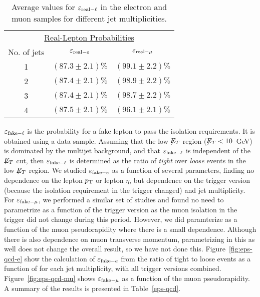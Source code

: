 \vspace{-0.2in}
\begin{table}[!h!tbp]
\begin{center}
\begin{minipage}{2.5 in}
\begin{ruledtabular}
\begin{tabular}{c||cc}
\multicolumn{3}{c}{\underline{Real-Lepton Probabilities}}
\vspace{0.1in}\\
No. of jets & $\varepsilon_{{\rm real-}e}$
            & $\varepsilon_{{\rm real-}\mu}$ \\
\hline
  1  &  $(87.3 \pm 2.1)\%$  &  $(99.1 \pm 2.2)\%$  \\
  2  &  $(87.4 \pm 2.1)\%$  &  $(98.9 \pm 2.2)\%$  \\
  3  &  $(87.4 \pm 2.1)\%$  &  $(98.7 \pm 2.2)\%$  \\
  4  &  $(87.5 \pm 2.1)\%$  &  $(96.1 \pm 2.1)\%$
\end{tabular}
\end{ruledtabular}
\vspace{-0.1in}
\caption[epssignal]{Average values for $\varepsilon_{{\rm real-}\ell}$
in the electron and muon samples for different jet multiplicities.}
\label{eps-signal}
\end{minipage}
\end{center}
\end{table}

\vspace{-0.2in}
$\varepsilon_{{\rm fake-}\ell}$ is the probability for a fake lepton
to pass the isolation requirements. It is obtained using a data
sample. Assuming that the low $\mbox{$\not\!\!E_T$}$ region ($\mbox{$\not\!\!E_T$} < 10$~GeV) is
dominated by the multijet background, and that $\varepsilon_{{\rm
fake-}\ell}$ is independent of the $\mbox{$\not\!\!E_T$}$ cut, then $\varepsilon_{{\rm
fake-}\ell}$ is determined as the ratio of \emph{tight} over
\emph{loose} events in the low $\mbox{$\not\!\!E_T$}$ region.
We studied $\varepsilon_{{\rm fake-}e}$ as a function of several
parameters, finding no dependence on the lepton $\mbox{$p_{\rm T}$}$ or lepton
$\eta$, but dependence on the trigger version (because the isolation
requirement in the trigger changed) and jet multiplicity. For
$\varepsilon_{{\rm fake-}\mu}$, we performed a similar set of studies
and found no need to parametrize as a function of the trigger version
as the muon isolation in the trigger did not change during this
period. However, we did paramterize as a function of the muon
pseudorapidity where there is a small dependence. Although there is
also dependence on muon transverse momentum, parametrizing in this as
well does not change the overall result, so we have not done this.
Figure~\ref{fig:eps-qcd-e} show the calculation of $\varepsilon_{{\rm
fake-}e}$ from the ratio of tight to loose events as a function of
{\met} for each jet multiplicity, with all trigger versions
combined. Figure~\ref{fig:eps-qcd-mu} shows $\varepsilon_{{\rm
fake-}\mu}$ as a function of the muon pseudorapidity. A summary of the
results is presented in Table~\ref{eps-qcd}.

